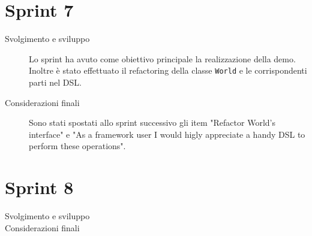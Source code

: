 \section{Sprint 7}\label{sec:sprint-7}
\begin{description}
    \item[Svolgimento e sviluppo] Lo sprint ha avuto come obiettivo principale la realizzazione della demo.
    Inoltre è stato effettuato il refactoring della classe \texttt{World} e le corrispondenti parti nel DSL\@.
    \item[Considerazioni finali] Sono stati spostati allo sprint successivo gli item "Refactor World's interface" e "As a framework user I would higly appreciate a handy DSL to perform these operations".
\end{description}
\section{Sprint 8}\label{sec:sprint-8}
\begin{description}
    \item[Svolgimento e sviluppo]
    \item[Considerazioni finali]
\end{description}
